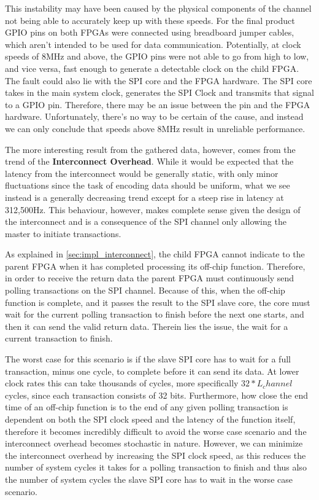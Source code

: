This instability may have been caused by the physical components of the channel not being able to accurately keep up with these speeds. For the final product GPIO pins on both FPGAs were connected using breadboard jumper cables, which aren't intended to be used for data communication. Potentially, at clock speeds of 8MHz and above, the GPIO pins were not able to go from high to low, and vice versa, fast enough to generate a detectable clock on the child FPGA. The fault could also lie with the SPI core and the FPGA hardware. The SPI core takes in the main system clock, generates the SPI Clock and transmits that signal to a GPIO pin. Therefore, there may be an issue between the pin and the FPGA hardware. Unfortunately, there's no way to be certain of the cause, and instead we can only conclude that speeds above 8MHz result in unreliable performance. 

The more interesting result from the gathered data, however, comes from the trend of the \textbf{Interconnect Overhead}. While it would be expected that the latency from the interconnect would be generally static, with only minor fluctuations since the task of encoding data should be uniform, what we see instead is a generally decreasing trend except for a steep rise in latency at 312,500Hz. This behaviour, however, makes complete sense given the design of the interconnect and is a consequence of the SPI channel only allowing the master to initiate transactions. 

As explained in \autoref{sec:impl_interconnect}, the child FPGA cannot indicate to the parent FPGA when it has completed processing its off-chip function. Therefore, in order to receive the return data the parent FPGA must continuously send polling transactions on the SPI channel. Because of this, when the off-chip function is complete, and it passes the result to the SPI slave core, the core must wait for the current polling transaction to finish before the next one starts, and then it can send the valid return data. Therein lies the issue, the wait for a current transaction to finish.

The worst case for this scenario is if the slave SPI core has to wait for a full transaction, minus one cycle, to complete before it can send its data. At lower clock rates this can take thousands of cycles, more specifically $32 * L_channel$ cycles, since each transaction consists of 32 bits. Furthermore, how close the end time of an off-chip function is to the end of any given polling transaction is dependent on both the SPI clock speed and the latency of the function itself, therefore it becomes incredibly difficult to avoid the worse case scenario and the interconnect overhead becomes stochastic in nature. However, we can minimize the interconnect overhead by increasing the SPI clock speed, as this reduces the number of system cycles it takes for a polling transaction to finish and thus also the number of system cycles the slave SPI core has to wait in the worse case scenario.

